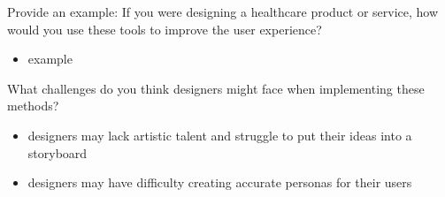 \documentclass[12pt]{article}
\begin{document}
Provide an example: If you were designing a healthcare product or service, how would you use these tools to improve the user experience?
\begin{itemize}
    \item example
\end{itemize}

What challenges do you think designers might face when implementing these methods?
\begin{itemize}
    \item designers may lack artistic talent and struggle to put their ideas into a storyboard
    \item designers may have difficulty creating accurate personas for their users
\end{itemize}
\end{document}
